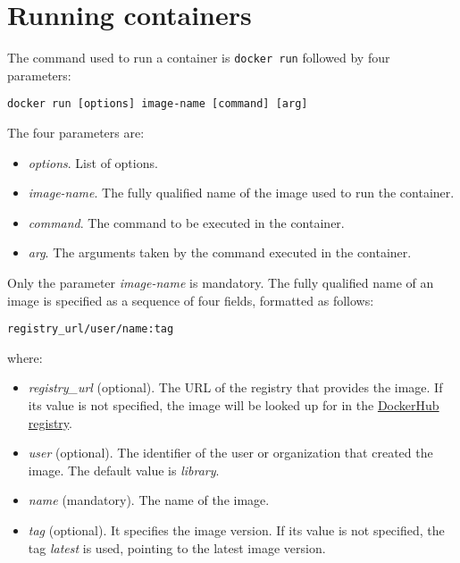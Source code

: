 \documentclass[
]{article}
\providecommand{\tightlist}{%
  \setlength{\itemsep}{0pt}\setlength{\parskip}{0pt}}
\theoremstyle{definition}
\theoremstyle{definition}
\theoremstyle{definition}
\theoremstyle{remark}
\begin{document}
\hypertarget{running}{%
\section{Running containers}\label{running}}

The command used to run a container
is \texttt{docker\ run} followed by four parameters:

\begin{verbatim}
docker run [options] image-name [command] [arg]
\end{verbatim}

The four parameters are:

\begin{itemize}
\tightlist
\item
  \emph{options}. List of options.
\item
  \emph{image-name}. The fully qualified name of the image used to run the container.
\item
  \emph{command}. The command to be executed in the container.
\item
  \emph{arg}. The arguments taken by the command executed in the container.
\end{itemize}

Only the parameter \emph{image-name} is mandatory.
The fully qualified name of an image is specified as a sequence of four fields,
formatted as follows:

\begin{verbatim}
registry_url/user/name:tag
\end{verbatim}

where:

\begin{itemize}
\tightlist
\item
  \emph{registry\_url} (optional). The URL of the registry that provides the image.
  If its value is not specified, the image
  will be looked up for in the
  \href{https://hub.docker.com}{DockerHub registry}.
\item
  \emph{user} (optional). The identifier of the user or organization that created the image.
  The default value is \emph{library}.
\item
  \emph{name} (mandatory). The name of the image.
\item
  \emph{tag} (optional). It specifies the image version.
  If its value is not specified,
  the tag \emph{latest} is used, pointing to the latest image version.
\end{itemize}
\end{document}

